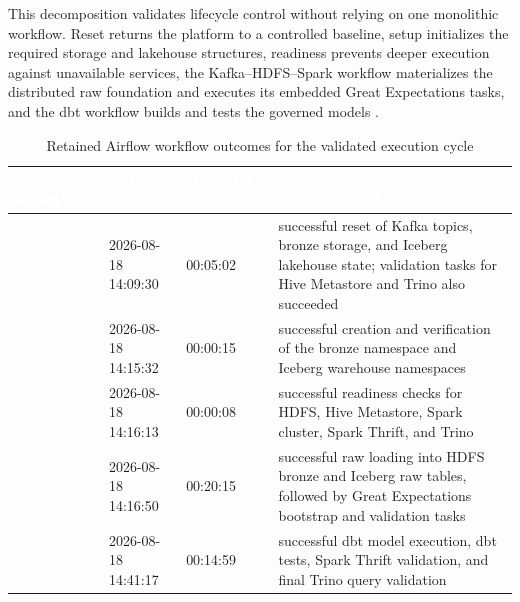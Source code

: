 This decomposition validates lifecycle control without relying on one monolithic workflow. Reset returns the platform to a controlled baseline, setup initializes the required storage and lakehouse structures, readiness prevents deeper execution against unavailable services, the Kafka--HDFS--Spark workflow materializes the distributed raw foundation and executes its embedded Great Expectations tasks, and the dbt workflow builds and tests the governed models \cite{apache_airflow_docs}.

\begin{table}[!htbp]
    \centering
    \scriptsize
    \renewcommand{\arraystretch}{1.12}
    \begin{tabularx}{\textwidth}{|L{0.34\textwidth}|L{0.13\textwidth}|L{0.15\textwidth}|Y|}
        \hline
        \textcolor{white}{\textbf{Validated workflow}} & \textcolor{white}{\textbf{Run date}} & \textcolor{white}{\textbf{Observed duration}} & \textcolor{white}{\textbf{Retained completion evidence}} \\
        \hline
         & 2026-08-18 14:09:30 & 00:05:02 & successful reset of Kafka topics, bronze storage, and Iceberg lakehouse state; validation tasks for Hive Metastore and Trino also succeeded \\
        \hline
         & 2026-08-18 14:15:32 & 00:00:15 & successful creation and verification of the bronze namespace and Iceberg warehouse namespaces \\
        \hline
         & 2026-08-18 14:16:13 & 00:00:08 & successful readiness checks for HDFS, Hive Metastore, Spark cluster, Spark Thrift, and Trino \\
        \hline
         & 2026-08-18 14:16:50 & 00:20:15 & successful raw loading into HDFS bronze and Iceberg raw tables, followed by Great Expectations bootstrap and validation tasks \\
        \hline
         & 2026-08-18 14:41:17 & 00:14:59 & successful dbt model execution, dbt tests, Spark Thrift validation, and final Trino query validation \\
        \hline
    \end{tabularx}
    \caption{Retained Airflow workflow outcomes for the validated execution cycle}
    \label{tab:chapter8-airflow-run-evidence}
\end{table}

